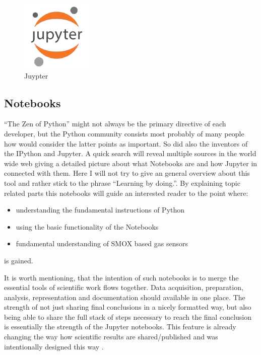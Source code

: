 \documentclass[11pt]{article}
\providecommand{\tightlist}{%
      \setlength{\itemsep}{0pt}\setlength{\parskip}{0pt}}
\begin{document}
    \begin{figure}
\centering
\includegraphics{media/icons/jupyter.png}
\caption{Juypter}
\end{figure}

    \hypertarget{notebooks}{%
\subsection{Notebooks}\label{notebooks}}

``The Zen of Python'' might not always be the primary directive of each
developer, but the Python community consists most probably of many
people how would consider the latter points as important. So did also
the inventors of the IPython and Jupyter. A quick search will reveal
multiple sources in the world wide web giving a detailed picture about
what Notebooks are and how Jupyter in connected with them. Here I will
not try to give an general overview about this tool and rather stick to
the phrase ``Learning by doing.''. By explaining topic related parts
this notebooks will guide an interested reader to the point where:

\begin{itemize}
\tightlist
\item
  understanding the fundamental instructions of Python
\item
  using the basic functionality of the Notebooks
\item
  fundamental understanding of SMOX based gas sensors
\end{itemize}

is gained.

It is worth mentioning, that the intention of such notebooks is to merge
the essential tools of scientific work flows together. Data acquisition,
preparation, analysis, representation and documentation should available
in one place. The strength of not just sharing final conclusions in a
nicely formatted way, but also being able to share the full stack of
steps necessary to reach the final conclusion is essentially the
strength of the Jupyter notebooks. This feature is already changing the
way how scientific results are shared/published and was intentionally
designed this way \cite{Randles2017}.
\end{document}

